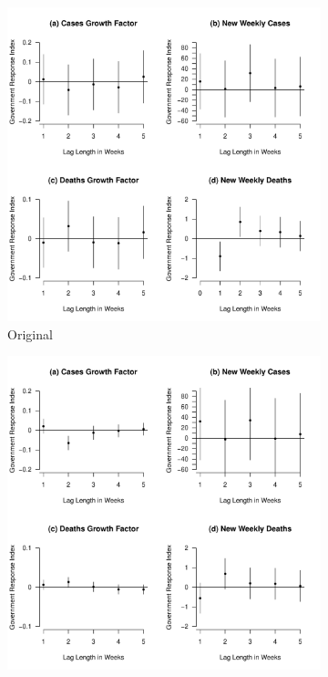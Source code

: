 \documentclass[12pt,letterpaper]{article}
\begin{document}
	\begin{figure}[p]
		\centering
		\begin{subfigure}[t]{0.6\textwidth}
			\centering
			\includegraphics[width=\textwidth]{gri.pdf}
			\caption{Original}
			\label{fig:gri}
		\end{subfigure}
		\vspace{0.5cm} %
		\begin{subfigure}[b]{0.48\textwidth}
			\centering
			\includegraphics[width=\textwidth]{agri.pdf}

\end{subfigure}
\end{figure}
\end{document}

